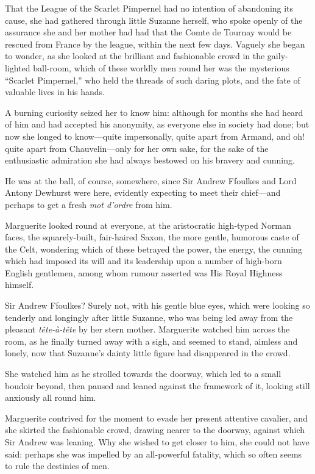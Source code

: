 \documentclass[paper=5.5in:8.5in,BCOR=7mm,twoside,DIV=calc,12pt,usegeometry,chapterprefix,endperiod,headings=big]{scrbook}
\begin{document}
That the League of the Scarlet Pimpernel had no intention of abandoning its cause, she had gathered through little Suzanne herself, who spoke openly of the assurance she and her mother had had that the Comte de Tournay would be rescued from France by the league, within the next few days. Vaguely she began to wonder, as she looked at the brilliant and fashionable crowd in the gaily-lighted ball-room, which of these worldly men round her was the mysterious \enquote{Scarlet Pimpernel,} who held the threads of such daring plots, and the fate of valuable lives in his hands.

A burning curiosity seized her to know him: although for months she had heard of him and had accepted his anonymity, as everyone else in society had done; but now she longed to know---quite impersonally, quite apart from Armand, and oh! quite apart from Chauvelin---only for her own sake, for the sake of the enthusiastic admiration she had always bestowed on his bravery and cunning.

He was at the ball, of course, somewhere, since Sir Andrew Ffoulkes and Lord Antony Dewhurst were here, evidently expecting to meet their chief---and perhaps to get a fresh \textit{mot d'ordre} from him.

Marguerite looked round at everyone, at the aristocratic high-typed Norman faces, the squarely-built, fair-haired Saxon, the more gentle, humorous caste of the Celt, wondering which of these betrayed the power, the energy, the cunning which had imposed its will and its leadership upon a number of high-born English gentlemen, among whom rumour asserted was His Royal Highness himself.

Sir Andrew Ffoulkes? Surely not, with his gentle blue eyes, which were looking so tenderly and longingly after little Suzanne, who was being led away from the pleasant \textit{tête-à-tête} by her stern mother. Marguerite watched him across the room, as he finally turned away with a sigh, and seemed to stand, aimless and lonely, now that Suzanne's dainty little figure had disappeared in the crowd.

She watched him as he strolled towards the doorway, which led to a small boudoir beyond, then paused and leaned against the framework of it, looking still anxiously all round him.

Marguerite contrived for the moment to evade her present attentive cavalier, and she skirted the fashionable crowd, drawing nearer to the doorway, against which Sir Andrew was leaning. Why she wished to get closer to him, she could not have said: perhaps she was impelled by an all-powerful fatality, which so often seems to rule the destinies of men.
\end{document}
